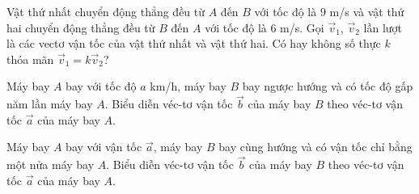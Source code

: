 

\begin{bt}%
	Vật thứ nhất chuyển động thẳng đều từ $A$ đến $B$ với tốc độ là $9$ m/s và vật thứ hai chuyển động thẳng đều từ $B$ đến $A$ với tốc độ là $6$ m/s. Gọi $\overrightarrow{v}_1$, $\overrightarrow{v}_2$ lần lượt là các vectơ vận tốc của vật thứ nhất và vật thứ hai. Có hay không số thực $k$ thỏa mãn $\overrightarrow{v}_1=k\overrightarrow{v}_2$?
\end{bt}

\begin{bt}%
	Máy bay $A$ bay với tốc độ $a$ km/h, máy bay $B$ bay ngược hướng và có tốc độ gấp năm lần máy bay $A$. Biểu diễn véc-tơ vận tốc $\overrightarrow{b}$ của máy bay $B$ theo véc-tơ vận tốc $\overrightarrow{a}$ của máy bay $A$.
\end{bt}

\begin{bt}%
	Máy bay $A$ bay với vận tốc $\overrightarrow{a}$, máy bay $B$ bay cùng hướng và có vận tốc chỉ bằng một nửa máy bay $A$. Biểu diễn véc-tơ vận tốc $\overrightarrow{b}$ của máy bay $B$ theo véc-tơ vận tốc $\overrightarrow{a}$ của máy bay $A$.
\end{bt}

